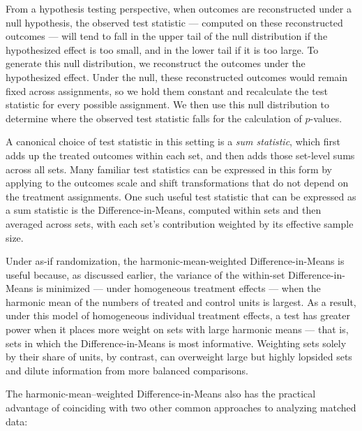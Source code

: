 \documentclass[
  12pt,
  leqno]{article}
\begin{document}
From a hypothesis testing perspective, when outcomes are reconstructed
under a null hypothesis, the observed test statistic --- computed on
these reconstructed outcomes --- will tend to fall in the upper tail of
the null distribution if the hypothesized effect is too small, and in
the lower tail if it is too large. To generate this null distribution,
we reconstruct the outcomes under the hypothesized effect. Under the
null, these reconstructed outcomes would remain fixed across
assignments, so we hold them constant and recalculate the test statistic
for every possible assignment. We then use this null distribution to
determine where the observed test statistic falls for the calculation of
\(p\)-values.

A canonical choice of test statistic in this setting is a \emph{sum
statistic}, which first adds up the treated outcomes within each set,
and then adds those set-level sums across all sets. Many familiar test
statistics can be expressed in this form by applying to the outcomes
scale and shift transformations that do not depend on the treatment
assignments. One such useful test statistic that can be expressed as a
sum statistic is the Difference-in-Means, computed within sets and then
averaged across sets, with each set's contribution weighted by its
effective sample size.

Under as-if randomization, the harmonic-mean-weighted
Difference-in-Means is useful because, as discussed earlier, the
variance of the within-set Difference-in-Means is minimized --- under
homogeneous treatment effects --- when the harmonic mean of the numbers
of treated and control units is largest. As a result, under this model
of homogeneous individual treatment effects, a test has greater power
when it places more weight on sets with large harmonic means --- that
is, sets in which the Difference-in-Means is most informative. Weighting
sets solely by their share of units, by contrast, can overweight large
but highly lopsided sets and dilute information from more balanced
comparisons.

The harmonic-mean--weighted Difference-in-Means also has the practical
advantage of coinciding with two other common approaches to analyzing
matched data:
\end{document}
